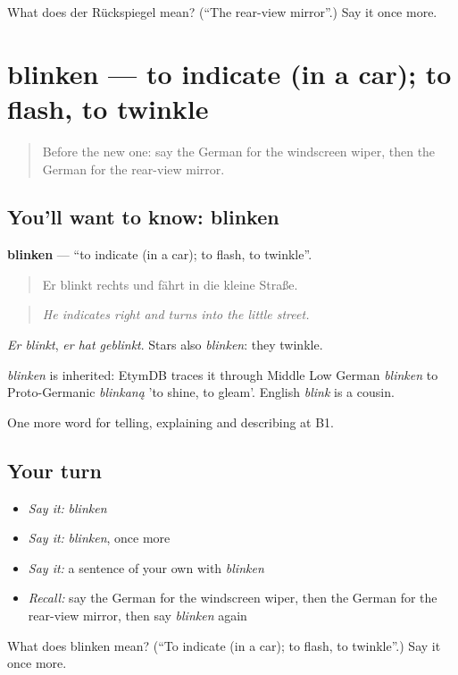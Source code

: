 \begin{tcolorbox}[breakable,colback=teal!4,colframe=teal!35!black,title={Before you move on}]
What does der Rückspiegel mean? (\textquotedblleft{}The rear-view mirror\textquotedblright{}.) Say it once more.
\end{tcolorbox}
\section[blinken]{blinken — to indicate (in a car); to flash, to twinkle}

\label{lesson:GE-C400-blinken}



\begin{quote}
Before the new one: say the German for the windscreen wiper, then the German for the rear-view mirror.
\end{quote}

\subsection*{You'll want to know: blinken}
\textbf{blinken} — \textquotedblleft{}to indicate (in a car); to flash, to twinkle\textquotedblright{}.

\begin{quote}
Er blinkt rechts und fährt in die kleine Straße.
\end{quote}

\begin{quote}
\emph{He indicates right and turns into the little street.}
\end{quote}

\emph{Er blinkt}, \emph{er hat geblinkt}. Stars also \emph{blinken}: they twinkle.

\begin{cousinweb}
\emph{blinken} is inherited: EtymDB traces it through Middle Low German \emph{blinken} to Proto-Germanic \emph{blinkaną} 'to shine, to gleam'. English \emph{blink} is a cousin.
\end{cousinweb}

\begin{grammarlens}[title={What you've built}]
One more word for telling, explaining and describing at B1.
\end{grammarlens}

\subsection*{Your turn}
\begin{itemize}
\raggedright
  \item \emph{Say it:} \emph{blinken}
  \item \emph{Say it:} \emph{blinken}, once more
  \item \emph{Say it:} a sentence of your own with \emph{blinken}
  \item \emph{Recall:} say the German for the windscreen wiper, then the German for the rear-view mirror, then say \emph{blinken} again
\end{itemize}

\begin{tcolorbox}[breakable,colback=teal!4,colframe=teal!35!black,title={Before you move on}]
What does blinken mean? (\textquotedblleft{}To indicate (in a car); to flash, to twinkle\textquotedblright{}.) Say it once more.
\end{tcolorbox}
